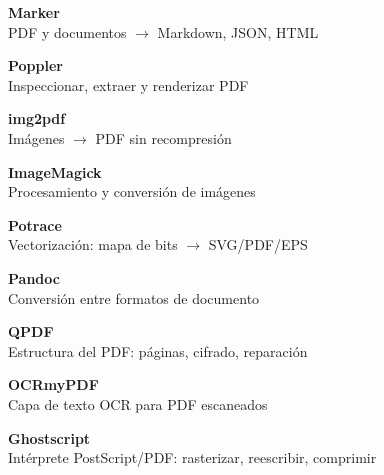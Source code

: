 \documentclass[11pt,a4paper]{article}
\begin{document}
\begin{titlepage}
		\begin{tcbraster}[raster columns=3, raster equal height, raster column skip=6pt,
			raster row skip=6pt, colback=acentoclaro, colframe=acentoclaro, boxrule=0pt,
			arc=2pt, left=6pt, right=6pt, top=5pt, bottom=5pt, fontupper=\sffamily\small]
			\begin{tcolorbox}\textbf{\color{acento}Marker}\\ PDF y documentos $\rightarrow$ Markdown, JSON, HTML\end{tcolorbox}
			\begin{tcolorbox}\textbf{\color{acento}Poppler}\\ Inspeccionar, extraer y renderizar PDF\end{tcolorbox}
			\begin{tcolorbox}\textbf{\color{acento}img2pdf}\\ Imágenes $\rightarrow$ PDF sin recompresión\end{tcolorbox}
			\begin{tcolorbox}\textbf{\color{acento}ImageMagick}\\ Procesamiento y conversión de imágenes\end{tcolorbox}
			\begin{tcolorbox}\textbf{\color{acento}Potrace}\\ Vectorización: mapa de bits $\rightarrow$ SVG/PDF/EPS\end{tcolorbox}
			\begin{tcolorbox}\textbf{\color{acento}Pandoc}\\ Conversión entre formatos de documento\end{tcolorbox}
			\begin{tcolorbox}\textbf{\color{acento}QPDF}\\ Estructura del PDF: páginas, cifrado, reparación\end{tcolorbox}
			\begin{tcolorbox}\textbf{\color{acento}OCRmyPDF}\\ Capa de texto OCR para PDF escaneados\end{tcolorbox}
			\begin{tcolorbox}\textbf{\color{acento}Ghostscript}\\ Intérprete PostScript/PDF: rasterizar, reescribir, comprimir\end{tcolorbox}
		\end{tcbraster}
		
		\vspace{0.9cm}
		

\end{titlepage}
\end{document}
